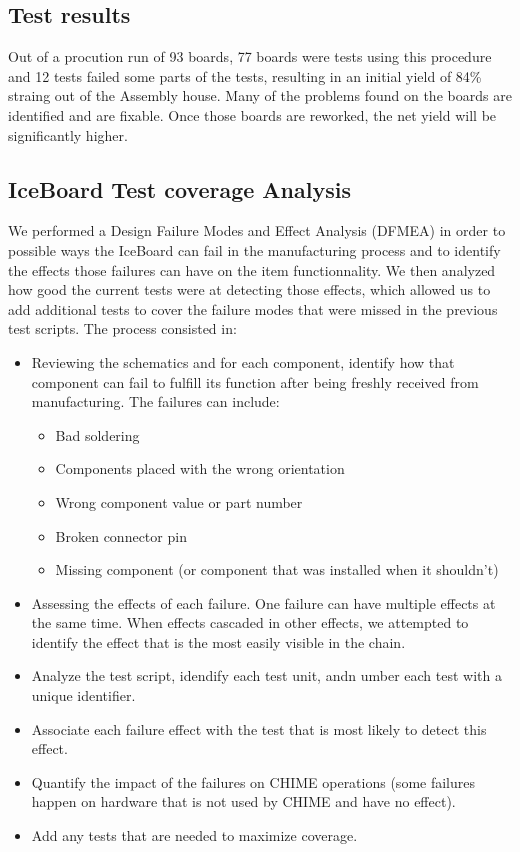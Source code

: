 \documentclass[11pt,article]{memoir}
\begin{document}
\subsection{Test results}

Out of a procution run of 93 boards, 77 boards were tests using this procedure and 12 tests failed some parts of the tests, resulting in an initial yield of 84\% straing out of the Assembly house. Many of the problems found on the boards are identified and are fixable. Once those boards are reworked, the net yield will be significantly higher.

\subsection{IceBoard Test coverage Analysis}

We performed a  Design Failure Modes and Effect Analysis (DFMEA) in order to possible ways the IceBoard can fail in the manufacturing process and
to identify the effects those failures can have on the item functionnality. We then analyzed how good the current tests were at detecting those effects, which allowed us to add additional tests to cover the failure modes that were missed in the previous test scripts. The process consisted in:

\begin{itemize}
	\item  Reviewing the schematics and for each component, identify how that component can fail to fulfill its function after being freshly received from manufacturing. The failures can include:
		\begin{itemize}
	     \item Bad soldering
	     \item Components placed with the wrong orientation
	     \item Wrong component value or part number
	     \item Broken connector pin
	     \item Missing component (or component that was installed when it shouldn't)
		\end{itemize}

	\item  Assessing the effects of each failure. One failure can have multiple
        effects at the same time. When effects cascaded in other effects, we
        attempted to identify the effect that is the most easily visible in
        the chain.
    \item Analyze the test script, idendify each test unit, andn umber each test with a unique identifier.

    \item Associate each failure effect with the test that is most likely to detect this effect.
    \item Quantify the impact of the failures on CHIME operations (some failures happen on hardware that is not used by CHIME and have no effect).

    \item Add any tests that are needed to maximize coverage.

\end{itemize}
\end{document}
